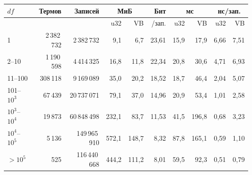 \begin{tabular}{|l|r|r|r|r|r|r|r|r|r|}
\hline
$df$ & Термов & Записей & \multicolumn{2}{c|}{МиБ} & Бит & \multicolumn{2}{c|}{мс} & \multicolumn{2}{c|}{нс/зап.} \\
\hline
 &  &  & u32 & VB & /зап. & u32 & VB & u32 & VB \\
\hline
1 & 2\,382\,732 & 2\,382\,732 & 9,1 & 6,7 & 23,61 & 15,9 & 17,9 & 6,66 & 7,51 \\
\hline
2--10 & 1\,190\,598 & 4\,414\,325 & 16,8 & 11,8 & 22,34 & 20,8 & 30,6 & 4,71 & 6,93 \\
\hline
11--100 & 308\,118 & 9\,169\,089 & 35,0 & 20,2 & 18,52 & 18,7 & 46,4 & 2,04 & 5,07 \\
\hline
101--$10^3$ & 67\,439 & 20\,737\,071 & 79,1 & 37,0 & 14,96 & 20,9 & 53,4 & 1,01 & 2,58 \\
\hline
$10^3$--$10^4$ & 19\,873 & 60\,848\,498 & 232,1 & 83,7 & 11,53 & 41,5 & 196,8 & 0,68 & 3,23 \\
\hline
$10^4$--$10^5$ & 5\,136 & 149\,965\,910 & 572,1 & 148,7 & 8,32 & 87,8 & 165,1 & 0,59 & 1,10 \\
\hline
$> 10^5$ & 525 & 116\,440\,668 & 444,2 & 111,2 & 8,01 & 59,5 & 92,3 & 0,51 & 0,79 \\
\hline
\end{tabular}
